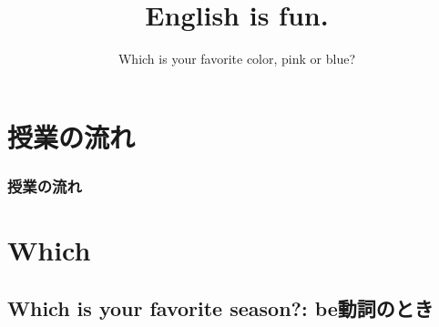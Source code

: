\documentclass[aspectratio=169,xcolor={dvipsnames,table}]{beamer}
\title{English is fun.}
\subtitle{Which is your favorite color, pink or blue?}
\author{}
\institute[]{}
\date[]
\begin{document}
\begin{frame}[plain]
  \titlepage
\end{frame}


\section*{授業の流れ}
\begin{frame}[plain]
  \frametitle{授業の流れ}
  \tableofcontents
\end{frame}



\section{Which }

\subsection{Which is your favorite season?: be動詞のとき}
%
%
%
%
%
%
%
%
%
%
%
%
%
\end{document}
